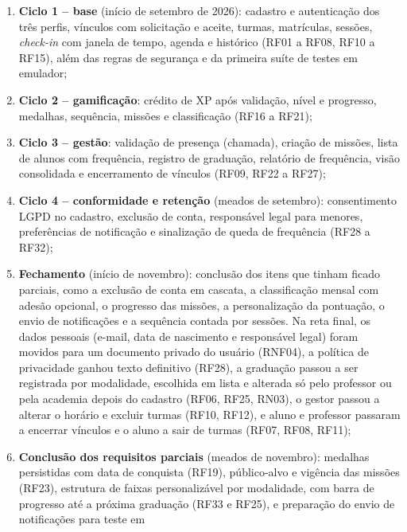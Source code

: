 \begin{enumerate}
  \item \textbf{Ciclo 1 -- base} (início de setembro de 2026): cadastro e
        autenticação dos três perfis, vínculos com solicitação e aceite,
        turmas, matrículas, sessões, \textit{check-in} com janela de tempo,
        agenda e histórico (RF01 a RF08, RF10 a RF15), além das regras de
        segurança e da primeira suíte de testes em emulador;
  \item \textbf{Ciclo 2 -- gamificação}: crédito de XP após validação,
        nível e progresso, medalhas, sequência, missões e classificação
        (RF16 a RF21);
  \item \textbf{Ciclo 3 -- gestão}: validação de presença (chamada),
        criação de missões, lista de alunos com frequência, registro de
        graduação, relatório de frequência, visão consolidada e
        encerramento de vínculos (RF09, RF22 a RF27);
  \item \textbf{Ciclo 4 -- conformidade e retenção} (meados de setembro):
        consentimento LGPD no cadastro, exclusão de conta, responsável
        legal para menores, preferências de notificação e sinalização de
        queda de frequência (RF28 a RF32);
  \item \textbf{Fechamento} (início de novembro): conclusão dos itens
        que tinham ficado parciais, como a exclusão de conta em cascata, a
        classificação mensal com adesão opcional, o progresso das missões,
        a personalização da pontuação, o envio de notificações e a
        sequência contada por sessões. Na reta final, os dados pessoais
        (e-mail, data de nascimento e responsável legal) foram movidos
        para um documento privado do usuário (RNF04), a política de
        privacidade ganhou texto definitivo (RF28), a graduação passou a
        ser registrada por modalidade, escolhida em lista e alterada só
        pelo professor ou pela academia depois do cadastro (RF06, RF25,
        RN03), o gestor passou a alterar o horário e excluir turmas
        (RF10, RF12), e aluno e professor passaram a encerrar vínculos e
        o aluno a sair de turmas (RF07, RF08, RF11);
  \item \textbf{Conclusão dos requisitos parciais} (meados de novembro):
        medalhas persistidas com data de conquista (RF19), público-alvo e
        vigência das missões (RF23), estrutura de faixas personalizável
        por modalidade, com barra de progresso até a próxima graduação
        (RF33 e RF25), e preparação do envio de notificações para teste em

\end{enumerate}
